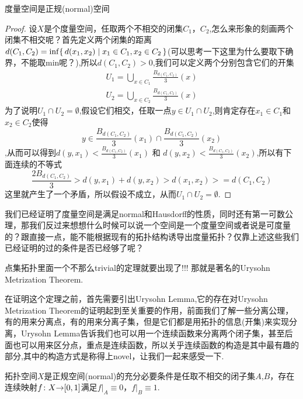 \begin{proposition}
度量空间是正规(normal)空间
\end{proposition}

\begin{proof}
设$X$是个度量空间，任取两个不相交的闭集$C_1$，$C_2$,怎么来形象的刻画两个闭集不相交呢？首先定义两个闭集的距离$d(C_1,C_2)=\inf\{\,d(x_1,x_2)\mid x_1 \in C_1,x_2 \in C_2\,\}$(可以思考一下这里为什么要取下确界，不能取min呢？),所以$d(C_1,C_2)>0$,我们可以定义两个分别包含它们的开集 
\begin{align} 
U_1 = \bigcup\limits_{x \in C_1}\frac{B_{d(C_1,C_2)}}{3}(x) \\ 
U_2 = \bigcup\limits_{x \in C_2}\frac{B_{d(C_1,C_2)}}{3}(x) 
\end{align}
为了说明$U_1 \cap U_2 = \emptyset$,假设它们相交，任取一点$y \in U_1 \cap U_2 $,则肯定存在$x_1 \in C_1$和$x_2 \in C_2$使得\[y \in \frac{B_{d(C_1,C_2)}}{3}(x_1) \cap \frac{B_{d(C_1,C_2)}}{3}(x_2) \],从而可以得到$d(y,x_1) < \frac{B_{d(C_1,C_2)}}{3}(x_1)$ 和 $d(y,x_2) < \frac{B_{d(C_1,C_2)}}{3}(x_2)$,所以有下面连续的不等式\[\frac{2B_{d(C_1,C_2)}}{3} > d(y,x_1) + d(y,x_2) > d(x_1,x_2) >= d(C_1,C_2)\]这里就产生了一个矛盾，所以假设不成立，从而$U_1 \cap U_2 = \emptyset$.
\end{proof}

我们已经证明了度量空间是满足\rm normal和\rm Hausdorff的性质，同时还有第一可数公理，那我们反过来想想什么时候可以说一个空间是一个度量空间或者说是可度量的？跟直接一点，能不能根据现有的拓扑结构诱导出度量拓扑？仅靠上述这些我们已经证明的过的条件是否已经够了呢？

点集拓扑里面一个不那么trivial的定理就要出现了!!! 那就是著名的Urysohn Metrization Theorem.

在证明这个定理之前，首先需要引出Urysohn Lemma,它的存在对Urysohn Metrization Theorem的证明起到至关重要的作用，前面我们了解一些分离公理，有的用来分离点，有的用来分离子集，但是它们都是用拓扑的信息(开集)来实现分离，Urysohn Lemma告诉我们也可以用一个连续函数来分离两个闭子集，甚至后面也可以用来区分点，重点是连续函数，所以关乎连续函数的构造是其中最有趣的部分,其中的构造方式是称得上novel，让我们一起来感受一下.



\begin{lemma}
拓扑空间$X$是正规空间(normal)的充分必要条件是任取不相交的闭子集$A$,$B$，存在连续映射${f}\colon{X}{\to}{[0,1]}$满足$f|_A \equiv 0$，$f|_B \equiv 1$.
\end{lemma}

